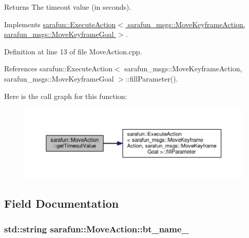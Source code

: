 \begin{DoxyReturn}{Returns}
The timeout value (in seconds). 
\end{DoxyReturn}


Implements \hyperlink{classsarafun_1_1ExecuteAction_aba6cfa8a8ce19e735eb6394424df6d17_aba6cfa8a8ce19e735eb6394424df6d17}{sarafun\-::\-Execute\-Action$<$ sarafun\-\_\-msgs\-::\-Move\-Keyframe\-Action, sarafun\-\_\-msgs\-::\-Move\-Keyframe\-Goal $>$}.



Definition at line 13 of file Move\-Action.\-cpp.



References sarafun\-::\-Execute\-Action$<$ sarafun\-\_\-msgs\-::\-Move\-Keyframe\-Action, sarafun\-\_\-msgs\-::\-Move\-Keyframe\-Goal $>$\-::fill\-Parameter().



Here is the call graph for this function\-:
\nopagebreak
\begin{figure}[H]
\begin{center}
\leavevmode
\includegraphics[width=350pt]{d6/d0e/classsarafun_1_1MoveAction_a3a0d4d2919b30b878c603a884db6a470_a3a0d4d2919b30b878c603a884db6a470_cgraph}
\end{center}
\end{figure}




\subsection{Field Documentation}
\hypertarget{classsarafun_1_1MoveAction_a8ae9ed380906de1299fdf28d43420b71_a8ae9ed380906de1299fdf28d43420b71}{
\subsubsection[{bt\-\_\-name\-\_\-}]{\setlength{\rightskip}{0pt plus 5cm}std\-::string sarafun\-::\-Move\-Action\-::bt\-\_\-name\-\_\-\hspace{0.3cm}{\ttfamily [private]}}}\label{classsarafun_1_1MoveAction_a8ae9ed380906de1299fdf28d43420b71_a8ae9ed380906de1299fdf28d43420b71}


